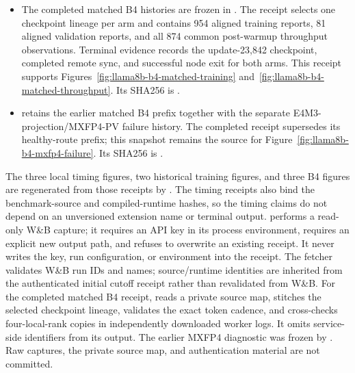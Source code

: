 \begin{itemize}
  \item The completed matched B4 histories are frozen in
  .  The receipt selects one
  checkpoint lineage per arm and contains 954 aligned training reports, 81 aligned validation
  reports, and all 874 common post-warmup throughput observations.  Terminal
  evidence records the update-23,842 checkpoint, completed remote sync, and
  successful node exit for both arms.  This receipt supports
  Figures~\ref{fig:llama8b-b4-matched-training}
  and~\ref{fig:llama8b-b4-matched-throughput}.  Its SHA256 is
  .
  \item {}
  retains the earlier matched B4 prefix together with the separate
  E4M3-projection/MXFP4-PV failure history.  The completed receipt supersedes
  its healthy-route prefix; this snapshot remains the source for
  Figure~\ref{fig:llama8b-b4-mxfp4-failure}.  Its SHA256 is
  .
\end{itemize}

The three local timing figures, two historical training figures, and three
B4 figures are regenerated from those receipts by
.  The timing receipts also bind the
benchmark-source and compiled-runtime hashes, so the timing claims do not
depend on an unversioned extension name or terminal output.
 performs a read-only W\&B capture; it
requires an API key in its process environment, requires an explicit new
output path, and refuses to overwrite an existing receipt.  It never writes
the key, run configuration, or environment into the receipt.  The fetcher
validates W\&B run IDs and names; source/runtime identities are inherited from
the authenticated initial cutoff receipt rather than revalidated from W\&B.
For the completed matched B4 receipt,
 reads a private source map, stitches the
selected checkpoint lineage, validates the exact token cadence, and
cross-checks four-local-rank copies in independently downloaded worker logs.
It omits service-side identifiers from its output.  The earlier MXFP4
diagnostic was frozen by .  Raw captures,
the private source map, and authentication material are not committed.

